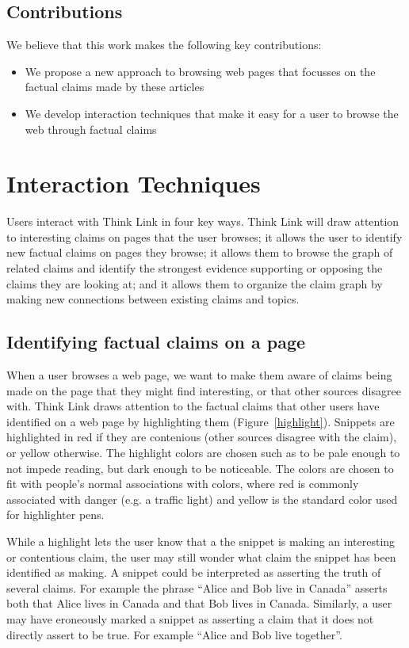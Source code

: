 \documentclass{chi2009}
\begin{document}
\subsection{Contributions}

We believe that this work makes the following key contributions:

\begin{itemize}
\item We propose a new approach to browsing web pages that focusses on the factual claims made by these articles
\item We develop interaction techniques that make it easy for a user to browse the web through factual claims
\end{itemize}

\section{Interaction Techniques}

Users interact with Think Link in four key ways. Think Link will draw attention to interesting claims on pages that the user browses; it allows the user to identify new factual claims on pages they browse; it allows them to browse the graph of related claims and identify the strongest evidence supporting or opposing the claims they are looking at; and it allows them to organize the claim graph by making new connections between existing claims and topics.

\subsection{Identifying factual claims on a page}

When a user browses a web page, we want to make them aware of claims being made on the page that they might find interesting, or that other sources disagree with. Think Link draws attention to the factual claims that other users have identified on a web page by highlighting them (Figure~\ref{highlight}). Snippets are highlighted in red if they are contenious (other sources disagree with the claim), or yellow otherwise. The highlight colors are chosen such as to be pale enough to not impede reading, but dark enough to be noticeable. The colors are chosen to fit with people's normal associations with colors, where red is commonly associated with danger (e.g. a traffic light) and yellow is the standard color used for highlighter pens.

While a highlight lets the user know that a the snippet is making an interesting or contentious claim, the user may still wonder what claim the snippet has been identified as making. A snippet could be interpreted as asserting the truth of several claims. For example the phrase ``Alice and Bob live in Canada'' asserts both that Alice lives in Canada and that Bob lives in Canada. Similarly, a user may have eroneously marked a snippet as asserting a claim that it does not directly assert to be true. For example ``Alice and Bob live together''.
\end{document}
